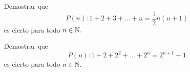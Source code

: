 \documentclass[xcolor={svgnames},
  hyperref={colorlinks}, 
  spanish, 12pt]{beamer}
\numberwithin{equation}{section} %
\numberwithin{figure}{section} %
\begin{document}
\begin{frame}[t]
 \begin{solved}
  Demostrar que $$P(n): 1+2+3+...+n=\frac{1}{2}n\left( n+1 \right)$$
  es cierto para todo $n \in \mathbb{N}.$
 \end{solved}

\end{frame}

\begin{frame}[t]
 \begin{solved}
  Demostrar que $$P(n): 1+2+2^{2}+...+2^{n}=2^{n+1}-1$$
  es cierto para todo $n \in \mathbb{N}.$
 \end{solved}

\end{frame}
\end{document}
